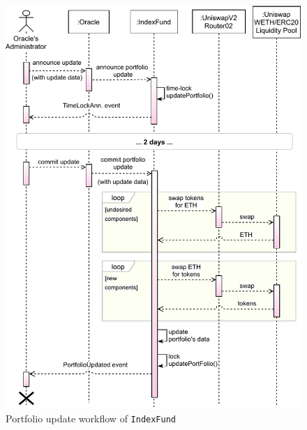 \begin{figure}
    \centering
  \includegraphics[width=\linewidth]{figures/update-seq.pdf}
  \caption{Portfolio update workflow of \texttt{IndexFund}}
  \label{fig:seq_update}
\end{figure}

